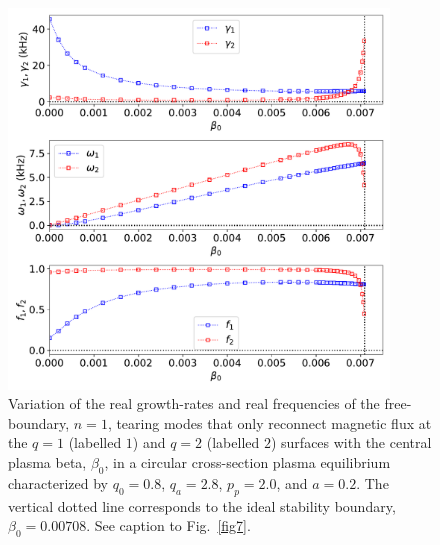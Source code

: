 \documentclass[12pt,prb,aps]{revtex4-1}
\begin{document}
\begin{figure}
\centerline{\includegraphics[width=0.9\textwidth]{Fig16.pdf}}
\caption{Variation of the real growth-rates and real frequencies of the free-boundary, $n=1$, tearing modes that only reconnect magnetic flux at the  $q=1$ (labelled $1$) and $q=2$ (labelled $2$)  surfaces with the central plasma beta, $\beta_0$, in a circular cross-section plasma equilibrium characterized by $q_0=0.8$, $q_a= 2.8$, $p_p=2.0$, and
$a=0.2$. The vertical dotted line corresponds to the ideal stability boundary, $\beta_0=0.00708$. See caption to Fig.~\ref{fig7}.\label{fig16}}
\end{figure}
\end{document}
